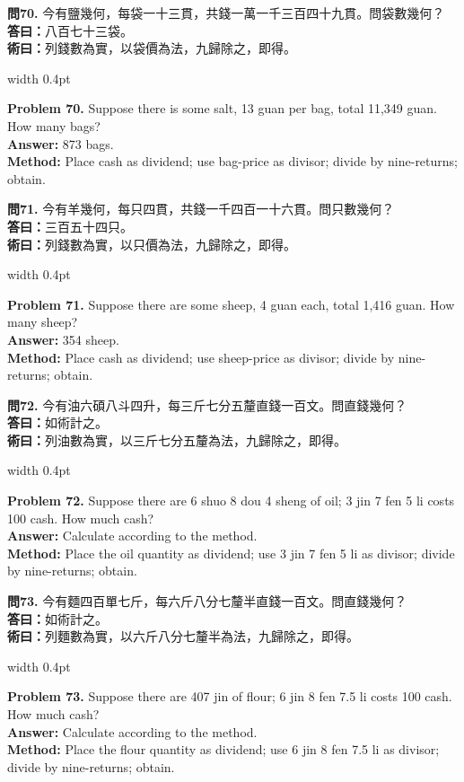 \documentclass[10pt,a4paper]{article}
\newlength{\cnwidth}
\newlength{\enwidth}
\newcommand{\bilingual}[2]{%
  \noindent%
  \begin{minipage}[t]{\cnwidth}%
    #1%
  \end{minipage}%
  \hfill\vrule width 0.4pt\hfill%
  \begin{minipage}[t]{\enwidth}%
    #2%
  \end{minipage}%
  \par\smallskip%
}
\begin{document}
\bilingual{%
  \textbf{問70.}
  今有鹽幾何，每袋一十三貫，共錢一萬一千三百四十九貫。問袋數幾何？\\
  \textbf{答曰：}八百七十三袋。\\
  \textbf{術曰：}列錢數為實，以袋價為法，九歸除之，即得。
}{%
  \textbf{Problem 70.}
  Suppose there is some salt, 13 guan per bag, total 11,349 guan.
  How many bags?\\
  \textbf{Answer:} 873 bags.\\
  \textbf{Method:} Place cash as dividend; use bag-price as divisor; divide by
  nine-returns; obtain.
}

\bilingual{%
  \textbf{問71.}
  今有羊幾何，每只四貫，共錢一千四百一十六貫。問只數幾何？\\
  \textbf{答曰：}三百五十四只。\\
  \textbf{術曰：}列錢數為實，以只價為法，九歸除之，即得。
}{%
  \textbf{Problem 71.}
  Suppose there are some sheep, 4 guan each, total 1,416 guan.
  How many sheep?\\
  \textbf{Answer:} 354 sheep.\\
  \textbf{Method:} Place cash as dividend; use sheep-price as divisor; divide by
  nine-returns; obtain.
}

\bilingual{%
  \textbf{問72.}
  今有油六碩八斗四升，每三斤七分五釐直錢一百文。問直錢幾何？\\
  \textbf{答曰：}如術計之。\\
  \textbf{術曰：}列油數為實，以三斤七分五釐為法，九歸除之，即得。
}{%
  \textbf{Problem 72.}
  Suppose there are 6 shuo 8 dou 4 sheng of oil; 3 jin 7 fen 5 li costs 100 cash.
  How much cash?\\
  \textbf{Answer:} Calculate according to the method.\\
  \textbf{Method:} Place the oil quantity as dividend; use 3 jin 7 fen 5 li as
  divisor; divide by nine-returns; obtain.
}

\bilingual{%
  \textbf{問73.}
  今有麵四百單七斤，每六斤八分七釐半直錢一百文。問直錢幾何？\\
  \textbf{答曰：}如術計之。\\
  \textbf{術曰：}列麵數為實，以六斤八分七釐半為法，九歸除之，即得。
}{%
  \textbf{Problem 73.}
  Suppose there are 407 jin of flour; 6 jin 8 fen 7.5 li costs 100 cash.
  How much cash?\\
  \textbf{Answer:} Calculate according to the method.\\
  \textbf{Method:} Place the flour quantity as dividend; use 6 jin 8 fen 7.5 li as
  divisor; divide by nine-returns; obtain.
}
\end{document}
